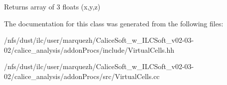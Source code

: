 \begin{DoxyReturn}{Returns}
array of 3 floats (x,y,z) 
\end{DoxyReturn}


The documentation for this class was generated from the following files\-:\begin{DoxyCompactItemize}
\item 
/nfs/dust/ilc/user/marquezh/\-Calice\-Soft\-\_\-w\-\_\-\-I\-L\-C\-Soft\-\_\-v02-\/03-\/02/calice\-\_\-analysis/addon\-Procs/include/Virtual\-Cells.\-hh\item 
/nfs/dust/ilc/user/marquezh/\-Calice\-Soft\-\_\-w\-\_\-\-I\-L\-C\-Soft\-\_\-v02-\/03-\/02/calice\-\_\-analysis/addon\-Procs/src/Virtual\-Cells.\-cc\end{DoxyCompactItemize}
